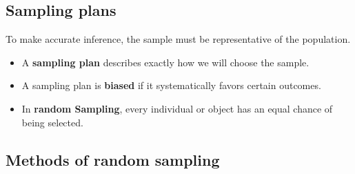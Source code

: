 \hypertarget{sampling-plans}{%
\subsection{Sampling plans}\label{sampling-plans}}

To make accurate inference, the sample must be representative of the
population.

\begin{itemize}
\item
  A \textbf{sampling plan} describes exactly how we will choose the
  sample.
\item
  A sampling plan is \textbf{biased} if it systematically favors certain
  outcomes.
\item
  In \textbf{random Sampling}, every individual or object has an equal
  chance of being selected.
\end{itemize}
\vspace*{-\baselineskip}

\hypertarget{methods-of-random-sampling-12}{%
\subsection{Methods of random sampling}\label{methods-of-random-sampling-12}}

